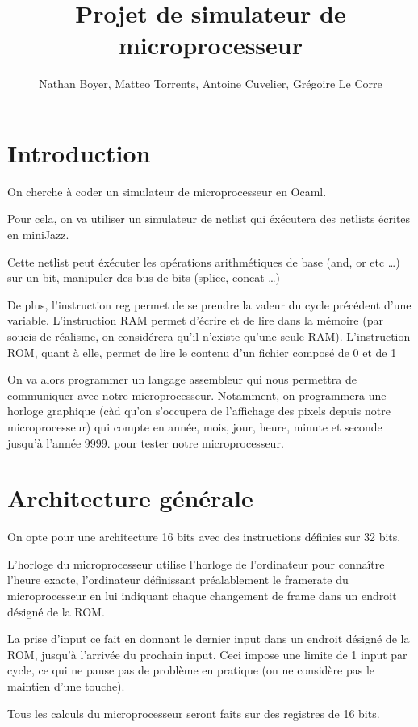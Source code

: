 \documentclass[12pt,a4paper,french]{article}
\title{Projet de simulateur de microprocesseur}
\author{Nathan Boyer, Matteo Torrents, Antoine Cuvelier, Grégoire Le Corre}
\begin{document}
\maketitle

\section*{Introduction}

On cherche à coder un simulateur de microprocesseur en Ocaml.

Pour cela, on va utiliser un simulateur de netlist qui éxécutera des netlists écrites en miniJazz.

Cette netlist peut éxécuter les opérations arithmétiques de base (and, or etc \ldots) sur un bit, manipuler des bus de bits (splice, concat \ldots)

De plus, l'instruction reg permet de se prendre la valeur du cycle précédent d'une variable. L'instruction RAM permet d'écrire et de lire dans la mémoire
(par soucis de réalisme, on considérera qu'il n'existe qu'une seule RAM). L'instruction ROM, quant à elle, permet de lire le contenu d'un fichier composé de 0 et de 1

On va alors programmer un langage assembleur qui nous permettra de communiquer avec notre microprocesseur. Notamment, on programmera une horloge graphique (càd qu'on s'occupera
de l'affichage des pixels depuis notre microprocesseur) qui compte en année, mois, jour, heure, minute et seconde jusqu'à l'année 9999.
pour tester notre microprocesseur.


\section{Architecture générale}

On opte pour une architecture 16 bits avec des instructions définies sur 32 bits.

L'horloge du microprocesseur utilise l'horloge de l'ordinateur pour connaître l'heure exacte, l'ordinateur définissant préalablement le framerate du microprocesseur en lui indiquant chaque changement de frame dans un endroit désigné de la ROM.

La prise d'input ce fait en donnant le dernier input dans un endroit désigné de la ROM, jusqu'à l'arrivée du prochain input. Ceci impose une limite de 1 input par cycle, ce qui ne pause pas de problème en pratique (on ne considère pas le maintien d'une touche).

Tous les calculs du microprocesseur seront faits sur des registres de 16 bits.
\end{document}
